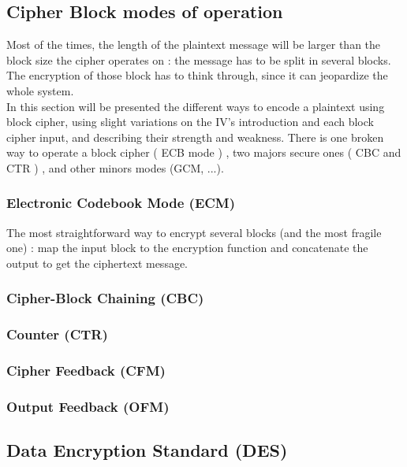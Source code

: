 \subsection{ Cipher Block modes of operation }

Most of the times, the length of the plaintext message will be larger than the block size the cipher operates on : the message has to be split in several blocks. The encryption of those block has to think through, since it can jeopardize the whole system. \\
In this section will be presented the different ways to encode a plaintext using block cipher, using slight variations on the IV's introduction and each block cipher input, and describing their strength and weakness. There is one broken way to operate a block cipher ( ECB mode ) , two majors secure ones ( CBC and CTR ) , and other minors modes (GCM, ...). \\

\subsubsection{ Electronic Codebook Mode (ECM) } 

The most straightforward way to encrypt several blocks (and the most fragile one) : map the input block to the encryption function and concatenate the output to get the ciphertext message.

\subsubsection{ Cipher-Block Chaining (CBC) }

\subsubsection{ Counter (CTR) }

\subsubsection{ Cipher Feedback (CFM) }

\subsubsection{ Output Feedback (OFM) }


\subsection{Data Encryption Standard (DES)}

